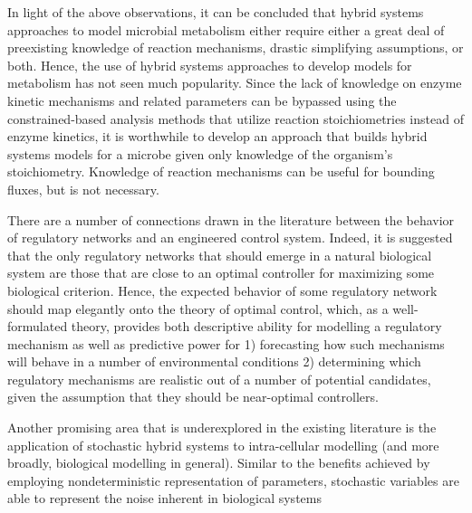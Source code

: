 In light of the above observations, it can be concluded that hybrid systems approaches to model microbial metabolism either require either a great deal of preexisting knowledge of reaction mechanisms, drastic simplifying assumptions, or both. Hence, the use of hybrid systems approaches to develop models for metabolism has not seen much popularity. Since the lack of knowledge on enzyme kinetic mechanisms and related parameters can be bypassed using the constrained-based analysis methods that utilize reaction stoichiometries instead of enzyme kinetics, it is worthwhile to develop an approach that builds hybrid systems models for a microbe given only knowledge of the organism's stoichiometry. Knowledge of reaction mechanisms can be useful for bounding fluxes, but is not necessary. 

There are a number of connections drawn in the literature between the behavior of regulatory networks and an engineered control system. Indeed, it is suggested that the only regulatory networks that should emerge in a natural biological system are those that are close to an optimal controller for maximizing some biological criterion. Hence, the expected behavior of some regulatory network should map elegantly onto the theory of optimal control, which, as a well-formulated theory, provides both descriptive ability for modelling a regulatory mechanism as well as predictive power for 1) forecasting how such mechanisms will behave in a number of environmental conditions 2) determining which regulatory mechanisms are realistic out of a number of potential candidates, given the assumption that they should be near-optimal controllers.

Another promising area that is underexplored in the existing literature is the application of stochastic hybrid systems to intra-cellular modelling (and more broadly, biological modelling in general). Similar to the benefits achieved by employing nondeterministic representation of parameters, stochastic variables are able to represent the noise inherent in biological systems 

